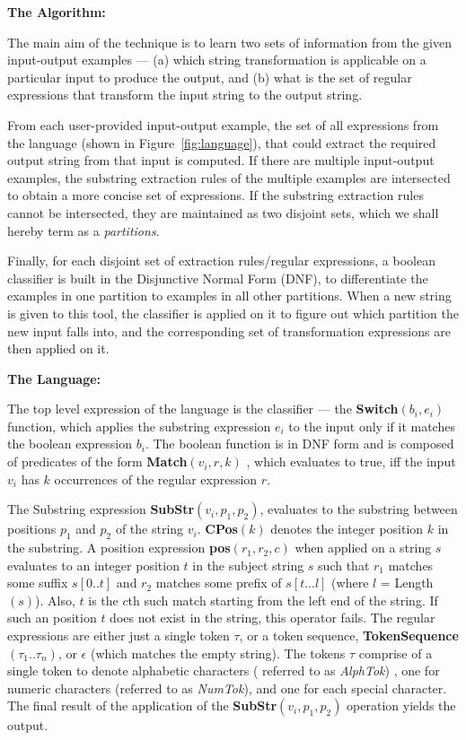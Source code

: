 {\bf The Algorithm:}

The main aim of the technique is to learn two sets of information from the given input-output examples --- (a) which string transformation is applicable on a particular input to produce the output, and (b) what is the set of regular expressions that transform the input string to the output string.

From each user-provided input-output example, the set of all expressions from the language (shown in Figure~\ref{fig:language}), that could extract the required output string from that input is computed. If there are multiple input-output examples, the substring extraction rules of the multiple examples are intersected to obtain a more concise set of expressions. If the substring extraction rules cannot be intersected, they are maintained as two disjoint sets, which we shall hereby term as a {\it partitions}. 

Finally, for each disjoint set of extraction rules/regular expressions, a boolean classifier is built in the Disjunctive Normal Form (DNF), to differentiate the examples in one partition to examples in all other partitions. When a new string is given to this tool, the classifier is applied on it to figure out which partition the new input falls into, and the corresponding set of transformation expressions are then applied on it.

{\bf The Language:}

The top level expression of the language is the classifier --- the {\bf Switch}$(b_i,e_i)$ function, which applies the substring expression $e_i$ to the input only if it matches the boolean expression $b_i$. The boolean function is in DNF form and is composed of predicates of the form {\bf Match}$(v_i,r,k)$ , which evaluates to true, iff the input $v_i$ has $k$ occurrences of the regular expression $r$.

The Substring expression {\bf SubStr}$(v_i,p_1,p_2)$, evaluates to the substring between positions $p_1$ and $p_2$ of the string $v_i$. {\bf CPos}$(k)$ denotes the integer position $k$ in the substring. A position expression {\bf pos}$(r_1,r_2,c)$ when applied on a string $s$ evaluates to an integer position $t$ in the subject string $s$ such that $r_1$ matches some suffix $s[0 ..t]$ and $r_2$ matches some prefix of $s[t ... l]$ (where $l$ = Length$(s)$). Also, $t$ is the $c$th such match starting from the left end of the string. If such an position $t$ does not exist in the string, this operator fails. The regular expressions are either just a single token $\tau$, or a token sequence, {\bf TokenSequence}$(\tau_1 .. \tau_n)$, or $\epsilon$ (which matches the empty string). The tokens $\tau$ comprise of a single token to denote alphabetic characters ( referred to as {\it AlphTok}) , one for numeric characters (referred to as {\it NumTok}), and one for each special character. The final result of the application of the {\bf SubStr}$(v_i,p_1,p_2)$ operation yields the output.

